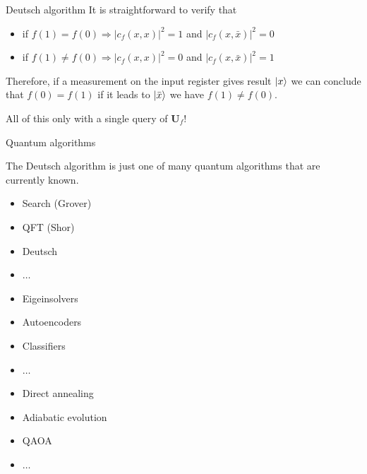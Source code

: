 \documentclass[11p,aspectratio=169]{beamer}
\begin{document}
\begin{frame}{Deutsch algorithm}
    It is straightforward to verify that
    \begin{itemize}
        \item if $f(1) = f(0) \Rightarrow |c_f(x,x)|^2 = 1$ and $|c_f(x,\bar{x})|^2 = 0$
        \item if $f(1) \neq f(0) \Rightarrow |c_f(x,x)|^2 = 0$ and $|c_f(x,\bar{x})|^2 = 1$
    \end{itemize}
    Therefore, if a measurement on the input register gives result $\ket{x}$ we can conclude that $f(0) = f(1)$
    if it leads to $\ket{\bar{x}}$ we have $f(1) \neq f(0)$.

    All of this only with a single query of $\textbf{U}_f$!

\end{frame}

\begin{frame}{Quantum algorithms}

    The Deutsch algorithm is just one of many quantum algorithms that are currently known.

\begin{multicols*}{3}
    \begin{tcolorbox}[title=Gate Circuits]
        \begin{itemize}
            \item Search (Grover)
            \item QFT (Shor)
            \item Deutsch
            \item $\dots$   
            \end{itemize}
     \end{tcolorbox}

\begin{tcolorbox}[title=Variational]
    \begin{itemize}
        \item Eigeinsolvers
        \item Autoencoders
        \item Classifiers
        \item $\dots$   
        \end{itemize}
 \end{tcolorbox}

 \begin{tcolorbox}[title=Annealing]
    \begin{itemize}
        \item Direct annealing
        \item Adiabatic evolution
        \item QAOA
        \item $\dots$   
        \end{itemize}
 \end{tcolorbox}

\end{multicols*}
    
\end{frame}
\end{document}

